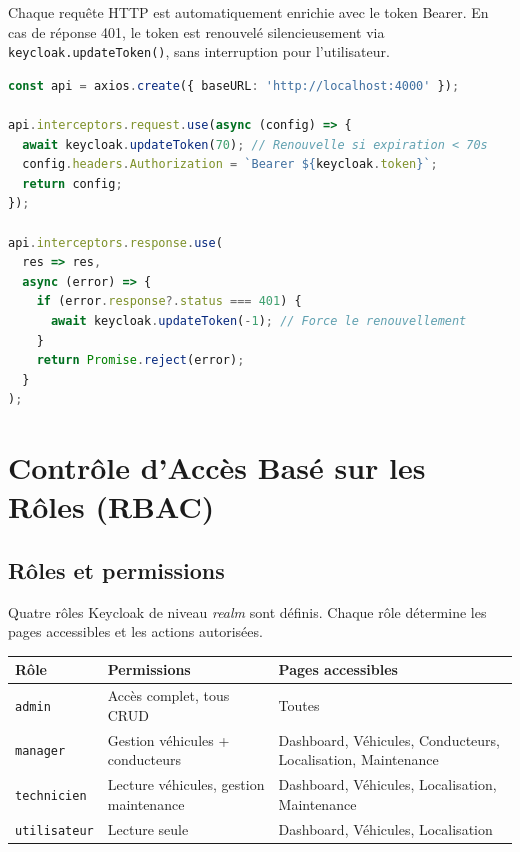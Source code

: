 \documentclass[12pt,a4paper]{report}
\begin{document}
Chaque requête HTTP est automatiquement enrichie avec le token Bearer.
En cas de réponse 401, le token est renouvelé silencieusement via
\texttt{keycloak.updateToken()}, sans interruption pour l'utilisateur.

\begin{lstlisting}[style=code, language=TypeScript, caption=\texttt{src/api.ts} — Intercepteur JWT avec auto-refresh]
const api = axios.create({ baseURL: 'http://localhost:4000' });

api.interceptors.request.use(async (config) => {
  await keycloak.updateToken(70); // Renouvelle si expiration < 70s
  config.headers.Authorization = `Bearer ${keycloak.token}`;
  return config;
});

api.interceptors.response.use(
  res => res,
  async (error) => {
    if (error.response?.status === 401) {
      await keycloak.updateToken(-1); // Force le renouvellement
    }
    return Promise.reject(error);
  }
);
\end{lstlisting}

\chapter{Contrôle d'Accès Basé sur les Rôles (RBAC)}

\section{Rôles et permissions}

Quatre rôles Keycloak de niveau \textit{realm} sont définis. Chaque rôle
détermine les pages accessibles et les actions autorisées.

\begin{center}
\begin{tabular}{|l|l|l|}
  \hline
  \rowcolor{lightblue}
  \textbf{Rôle} & \textbf{Permissions} & \textbf{Pages accessibles} \\
  \hline
  \texttt{admin}
    & Accès complet, tous CRUD
    & Toutes \\
  \hline
  \texttt{manager}
    & Gestion véhicules + conducteurs
    & Dashboard, Véhicules, Conducteurs, \newline Localisation, Maintenance \\
  \hline
  \texttt{technicien}
    & Lecture véhicules, gestion maintenance
    & Dashboard, Véhicules, Localisation, \newline Maintenance \\
  \hline
  \texttt{utilisateur}
    & Lecture seule
    & Dashboard, Véhicules, Localisation \\
  \hline
\end{tabular}
\end{center}
\end{document}
